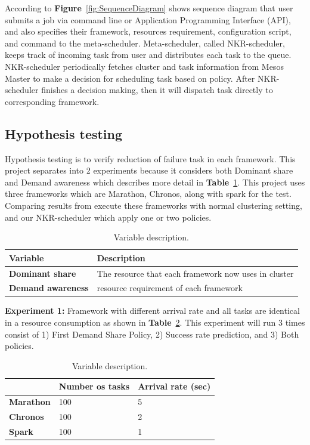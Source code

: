 \documentclass[12pt,oneside,openright,a4paper]{cpe-english-project}
\begin{document}
According to \textbf{Figure}~\ref{fig:SequenceDiagram} shows sequence diagram that user submits a job via command line or Application Programming Interface (API), and also specifies their framework, resources requirement, configuration script, and command to the meta-scheduler. Meta-scheduler, called NKR-scheduler, keeps track of incoming task from user and distributes each task to the queue. NKR-scheduler periodically fetches cluster and task information from Mesos Master to make a decision for scheduling task based on policy.  After NKR-scheduler finishes a decision making, then it will dispatch task directly to corresponding framework.

\subsection{Hypothesis testing} 
Hypothesis testing is to verify reduction of failure task in each framework. This project separates into 2 experiments because it considers both Dominant share and Demand awareness which describes more detail in \textbf{Table}~\ref{tbl:VariableDescription}. This project uses three frameworks which are Marathon, Chronos, along with spark for the test.  Comparing results from execute these frameworks with normal clustering setting, and our NKR-scheduler which apply one or two policies.

\begin{table}[!h]
\caption{Variable description.}\label{tbl:VariableDescription}
\begin{tabular}{|l|l|}
\hline
\textbf{Variable} & \textbf{Description}\\
\hline
\textbf{Dominant share} & The resource that each framework now uses in cluster\\
\hline
\textbf{Demand awareness} & resource requirement of each framework \\
\hline
\end{tabular}
\end{table}

\textbf{Experiment 1:} Framework with different arrival rate and all tasks are identical in a resource consumption as shown in \textbf{Table}~\ref{tbl:Experiment1}. This experiment will run 3 times consist of 1) First Demand Share Policy, 2) Success rate prediction, and 3) Both policies.

\begin{table}[!h]
\caption{Variable description.}\label{tbl:Experiment1}
\begin{tabular}{|l|l|l|}
\hline
 & \textbf{Number os tasks} & \textbf{Arrival rate (sec)}\\
\hline
\textbf{Marathon} & 100 & 5\\
\hline
\textbf{Chronos} & 100 & 2 \\
\hline
\textbf{Spark} & 100 & 1 \\
\hline
\end{tabular}
\end{table}
\end{document}

